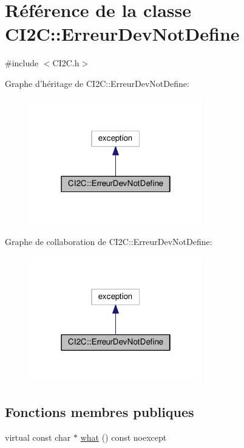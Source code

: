\hypertarget{class_c_i2_c_1_1_erreur_dev_not_define}{\section{Référence de la classe C\+I2\+C\+:\+:Erreur\+Dev\+Not\+Define}
\label{class_c_i2_c_1_1_erreur_dev_not_define}
}


{\ttfamily \#include $<$C\+I2\+C.\+h$>$}



Graphe d'héritage de C\+I2\+C\+:\+:Erreur\+Dev\+Not\+Define\+:
\nopagebreak
\begin{figure}[H]
\begin{center}
\leavevmode
\includegraphics[width=214pt]{class_c_i2_c_1_1_erreur_dev_not_define__inherit__graph}
\end{center}
\end{figure}


Graphe de collaboration de C\+I2\+C\+:\+:Erreur\+Dev\+Not\+Define\+:
\nopagebreak
\begin{figure}[H]
\begin{center}
\leavevmode
\includegraphics[width=214pt]{class_c_i2_c_1_1_erreur_dev_not_define__coll__graph}
\end{center}
\end{figure}
\subsection*{Fonctions membres publiques}
\begin{DoxyCompactItemize}
\item 
virtual const char $\ast$ \hyperlink{class_c_i2_c_1_1_erreur_dev_not_define_a8c2f805ea7adc632db53c58437c2884e}{what} () const noexcept
\end{DoxyCompactItemize}


